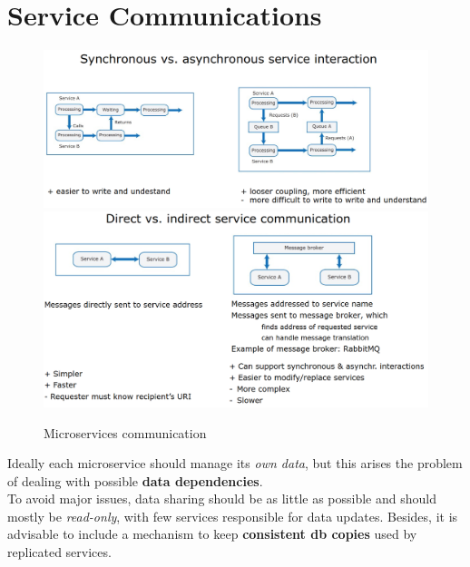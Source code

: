 \section{Service Communications}
\begin{figure}[htbp]
   \centering
   \includegraphics{images/microservices_communications1.png}\\
   \includegraphics{images/microservices_communications2.png}
   \caption{Microservices communication}
   \label{fig:microservices_communications}
\end{figure}


Ideally each microservice should manage its \textit{own data}, but this arises the problem of dealing with possible \textbf{data dependencies}.
\\
To avoid major issues, data sharing should be as little as possible
and should mostly be \textit{read-only}, with few services responsible for data updates.
Besides, it is advisable to include a mechanism to keep \textbf{consistent db copies} used by replicated services.

